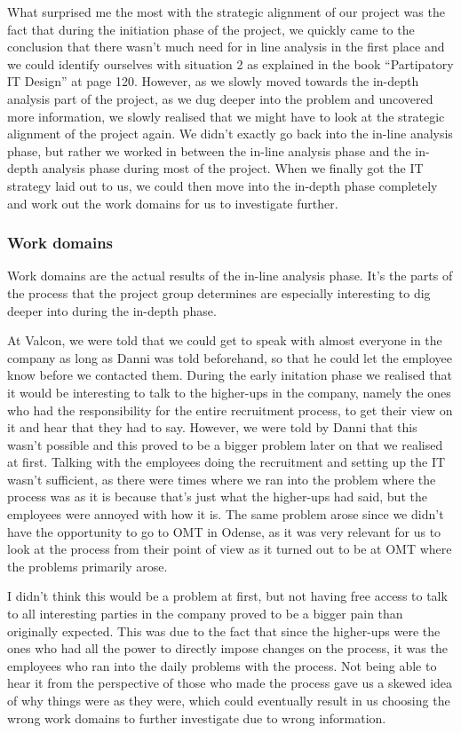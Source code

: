 What surprised me the most with the strategic alignment of our project was the fact that during the initiation phase of the project, we quickly came to the conclusion that there wasn’t much need for in line analysis in the first place and we could identify ourselves with situation 2 as explained in the book “Partipatory IT Design” at page 120. However, as we slowly moved towards the in-depth analysis part of the project, as we dug deeper into the problem and uncovered more information, we slowly realised that we might have to look at the strategic alignment of the project again.
We didn’t exactly go back into the in-line analysis phase, but rather we worked in between the in-line analysis phase and the in-depth analysis phase during most of the project. When we finally got the IT strategy laid out to us, we could then move into the in-depth phase completely and work out the work domains for us to investigate further.

\subsubsection{Work domains}
Work domains are the actual results of the in-line analysis phase. It’s the parts of the process that the project group determines are especially interesting to dig deeper into during the in-depth phase. 

At Valcon, we were told that we could get to speak with almost everyone in the company as long as Danni was told beforehand, so that he could let the employee know before we contacted them. During the early initation phase we realised that it would be interesting to talk to the higher-ups in the company, namely the ones who had the responsibility for the entire recruitment process, to get their view on it and hear that they had to say. However, we were told by Danni that this wasn’t possible and this proved to be a bigger problem later on that we realised at first. 
Talking with the employees doing the recruitment and setting up the IT wasn’t sufficient, as there were times where we ran into the problem where the process was as it is because that’s just what the higher-ups had said, but the employees were annoyed with how it is. The same problem arose since we didn’t have the opportunity to go to OMT in Odense, as it was very relevant for us to look at the process from their point of view as it turned out to be at OMT where the problems primarily arose.

I didn’t think this would be a problem at first, but not having free access to talk to all interesting parties in the company proved to be a bigger pain than originally expected. This was due to the fact that since the higher-ups were the ones who had all the power to directly impose changes on the process, it was the employees who ran into the daily problems with the process. Not being able to hear it from the perspective of those who made the process gave us a skewed idea of why things were as they were, which could eventually result in us choosing the wrong work domains to further investigate due to wrong information.

